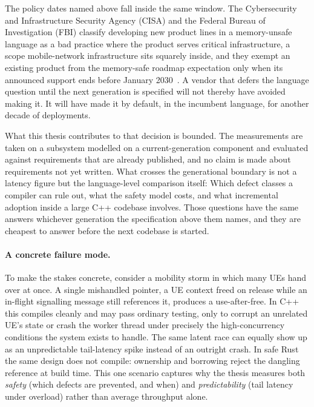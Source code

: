 \documentclass[english,oneside,a4paper,censored,csm,software-track-2020]{HYthesisML}
\begin{document}
The policy dates named above fall inside the same window. The Cybersecurity and Infrastructure
Security Agency (CISA) and the Federal Bureau of Investigation (FBI) classify developing new
product lines in a memory-unsafe language as a bad practice where the product serves critical
infrastructure, a scope mobile-network infrastructure sits squarely inside, and they exempt an
existing product from the memory-safe roadmap expectation only when its announced support ends
before January 2030~\cite{cisa2025badpractices}. A vendor that defers the language question until
the next generation is specified will not thereby have avoided making it. It will have made it by
default, in the incumbent language, for another decade of deployments.

What this thesis contributes to that decision is bounded. The measurements are taken on a
subsystem modelled on a current-generation component and evaluated against requirements that are
already published, and no claim is made about requirements not yet written. What crosses the
generational boundary is not a latency figure but the language-level comparison itself: Which
defect classes a compiler can rule out, what the safety model costs, and what incremental
adoption inside a large C++ codebase involves. Those questions have the same answers whichever
generation the specification above them names, and they are cheapest to answer before the next
codebase is started.

\paragraph{A concrete failure mode.}
To make the stakes concrete, consider a mobility storm in which many UEs hand over at once. A
single mishandled pointer, a UE context freed on release while an in-flight signalling message
still references it, produces a use-after-free. In C++ this compiles cleanly and may pass
ordinary testing, only to corrupt an unrelated UE's state or crash the worker thread under
precisely the high-concurrency conditions the system exists to handle. The same latent race can
equally show up as an unpredictable tail-latency spike instead of an outright crash. In safe Rust
the same design does not compile: ownership and borrowing reject the dangling reference at build
time. This one scenario captures why the thesis measures both \emph{safety} (which defects are
prevented, and when) and \emph{predictability} (tail latency under overload) rather than average
throughput alone.
\end{document}
